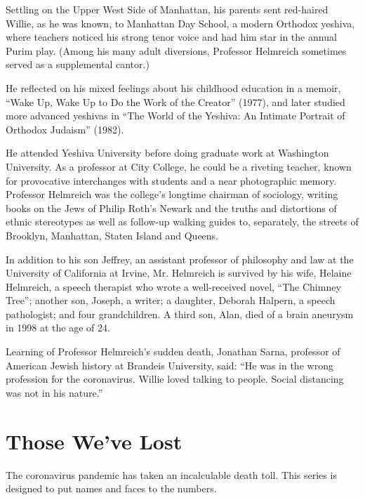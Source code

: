 Settling on the Upper West Side of Manhattan, his parents sent
red-haired Willie, as he was known, to Manhattan Day School, a modern
Orthodox yeshiva, where teachers noticed his strong tenor voice and had
him star in the annual Purim play. (Among his many adult diversions,
Professor Helmreich sometimes served as a supplemental cantor.)

He reflected on his mixed feelings about his childhood education in a
memoir, ``Wake Up, Wake Up to Do the Work of the Creator'' (1977), and
later studied more advanced yeshivas in ``The World of the Yeshiva: An
Intimate Portrait of Orthodox Judaism'' (1982).

He attended Yeshiva University before doing graduate work at Washington
University. As a professor at City College, he could be a riveting
teacher, known for provocative interchanges with students and a near
photographic memory. Professor Helmreich was the college's longtime
chairman of sociology, writing books on the Jews of Philip Roth's Newark
and the truths and distortions of ethnic stereotypes as well as
follow-up walking guides to, separately, the streets of Brooklyn,
Manhattan, Staten Island and Queens.

In addition to his son Jeffrey, an assistant professor of philosophy and
law at the University of California at Irvine, Mr. Helmreich is survived
by his wife, Helaine Helmreich, a speech therapist who wrote a
well-received novel, ``The Chimney Tree''; another son, Joseph, a
writer; a daughter, Deborah Halpern, a speech pathologist; and four
grandchildren. A third son, Alan, died of a brain aneurysm in 1998 at
the age of 24.

Learning of Professor Helmreich's sudden death, Jonathan Sarna,
professor of American Jewish history at Brandeis University, said: ``He
was in the wrong profession for the coronavirus. Willie loved talking to
people. Social distancing was not in his nature.''

\href{https://www.nytimes3xbfgragh.onion/interactive/2020/obituaries/people-died-coronavirus-obituaries.html?action=click\&pgtype=Article\&state=default\&region=BELOW_MAIN_CONTENT\&context=covid_obits_promo}{}

\hypertarget{those-weve-lost}{%
\section{Those We've Lost}\label{those-weve-lost}}

The coronavirus pandemic has taken an incalculable death toll. This
series is designed to put names and faces to the numbers.

